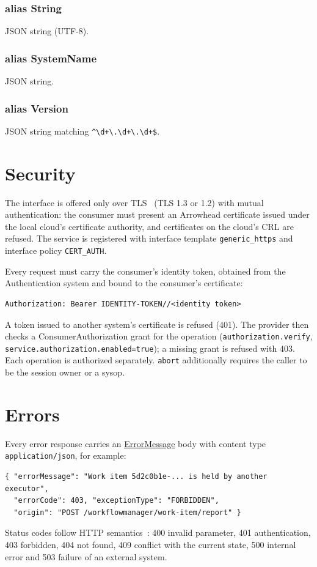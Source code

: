 \documentclass[a4paper]{arrowhead}
\newcommand{\mref}[1]{{\textcolor{ArrowheadPurple}{\hyperref[sec:model:#1]{#1}}}}
\newcommand{\pdef}[1]{{\textcolor{ArrowheadGrey}{#1\label{sec:model:primitives:#1}\label{sec:model:primitives:#1s}}}}
\begin{document}
\subsubsection*{alias \pdef{String}}
JSON string (UTF-8).

\subsubsection*{alias \pdef{SystemName}}
JSON string.

\subsubsection*{alias \pdef{Version}}
JSON string matching \texttt{\^{}\textbackslash{}d+\textbackslash{}.\textbackslash{}d+\textbackslash{}.\textbackslash{}d+\$}.



\section{Security}
\label{sec:security}
The interface is offered only over TLS~\cite{rfc8446} (TLS 1.3 or 1.2) with mutual authentication: the consumer must
present an Arrowhead certificate issued under the local cloud's certificate authority, and certificates on the
cloud's CRL are refused. The service is registered with interface template \texttt{generic\_https} and interface
policy \texttt{CERT\_AUTH}.

Every request must carry the consumer's identity token, obtained from the Authentication system and bound to the
consumer's certificate:
\begin{lstlisting}
Authorization: Bearer IDENTITY-TOKEN//<identity token>
\end{lstlisting}
A token issued to another system's certificate is refused (401). The provider then checks a ConsumerAuthorization
grant for the operation (\texttt{authorization.verify}, \texttt{service.authorization.enabled=true}); a missing grant is
refused with 403. Each operation is authorized separately. \texttt{abort} additionally requires the caller to be the session owner or a sysop.


\section{Errors}
\label{sec:errors}
Every error response carries an \mref{ErrorMessage} body with content type \texttt{application/json}, for example:
\begin{lstlisting}
{ "errorMessage": "Work item 5d2c0b1e-... is held by another executor",
  "errorCode": 403, "exceptionType": "FORBIDDEN",
  "origin": "POST /workflowmanager/work-item/report" }
\end{lstlisting}
Status codes follow HTTP semantics~\cite{rfc9110}: 400 invalid parameter, 401 authentication, 403 forbidden, 404 not
found, 409 conflict with the current state, 500 internal error and 503 failure of an external system.
\end{document}
